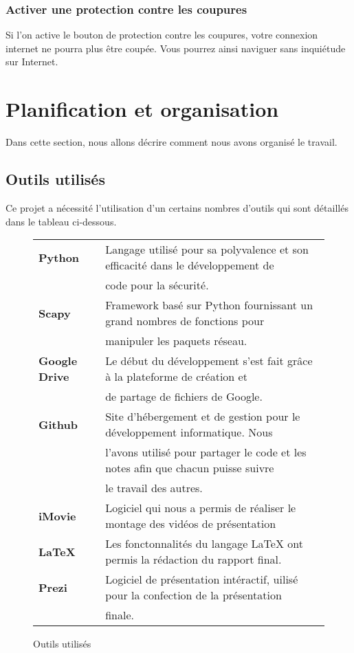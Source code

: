 \documentclass[11pt]{article}
\begin{document}
\subsubsection{Activer une protection contre les coupures}
Si l'on active le bouton de protection contre les coupures, votre connexion internet ne pourra plus être coupée. Vous pourrez ainsi naviguer sans inquiétude sur Internet.




\section{Planification et organisation}
Dans cette section, nous allons décrire comment nous avons organisé le travail.

\subsection{Outils utilisés}
Ce projet a nécessité l'utilisation d'un certains nombres d'outils qui sont détaillés dans le tableau ci-dessous.~\\
\begin{figure}[h]
\centering
\begin{tabular}{|l|l|}
\hline
   \textbf{Python} & Langage utilisé pour sa polyvalence et son efficacité dans le développement de  \\
    &code pour la sécurité. \\ \hline
    \textbf{Scapy} & Framework basé sur Python fournissant un grand nombres de fonctions pour  \\
    & manipuler les paquets réseau. \\ \hline
   \textbf{Google Drive} & Le début du développement s'est fait grâce à la plateforme de création et  \\
	& de partage de fichiers de Google. \\ \hline
\textbf{Github} & Site d'hébergement et de gestion pour le développement informatique. Nous \\ 
&   l'avons utilisé pour partager le code et les notes afin que chacun puisse suivre   \\
&  le travail des autres. \\ \hline
\textbf{iMovie} & Logiciel qui nous a permis de réaliser le montage des vidéos de présentation \\ \hline
\textbf{LaTeX} & Les fonctonnalités du langage LaTeX ont permis la rédaction du rapport final. \\ \hline
\textbf{Prezi} & Logiciel de présentation intéractif, uilisé pour la confection de la présentation \\
& finale.\\ \hline
\end{tabular}
\caption{Outils utilisés}
\end{figure}
\end{document}
